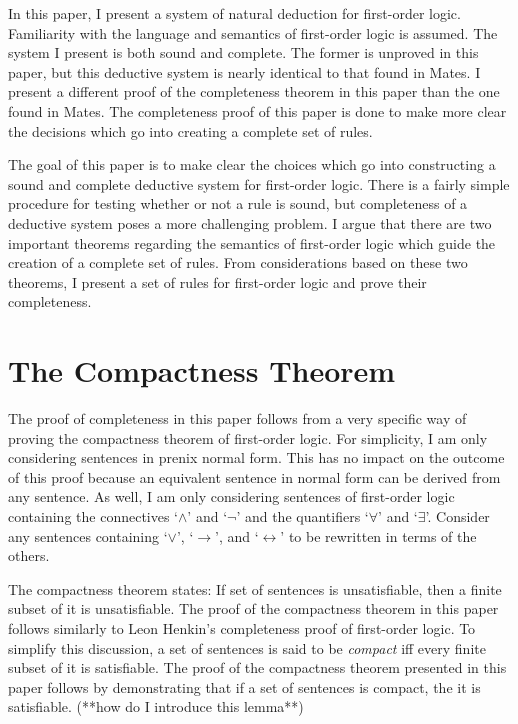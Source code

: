 \documentclass[12pt]{article}
\theoremstyle{definition}
\theoremstyle{remark}
\begin{document}
In this paper, I present a system of natural deduction for first-order logic. Familiarity with the language and semantics of first-order logic is assumed. The system I present is both sound and complete. The former is unproved in this paper, but this deductive system is nearly identical to that found in Mates\cite{mates}. I present a different proof of the completeness theorem in this paper than the one found in Mates. The completeness proof of this paper is done to make more clear the decisions which go into creating a complete set of rules.

The goal of this paper is to make clear the choices which go into constructing a sound and complete deductive system for first-order logic. There is a fairly simple procedure for testing whether or not a rule is sound, but completeness of a deductive system poses a more challenging problem. I argue that there are two important theorems regarding the semantics of first-order logic which guide the creation of a complete set of rules. From considerations based on these two theorems, I present a set of rules for first-order logic and prove their completeness.


\section{The Compactness Theorem}

The proof of completeness in this paper follows from a very specific way of proving the compactness theorem of first-order logic. For simplicity, I am only considering sentences in prenix normal form. This has no impact on the outcome of this proof because an equivalent sentence in normal form can be derived from any sentence. As well, I am only considering sentences of first-order logic containing the connectives `$\land$' and `$\neg$' and the quantifiers `$\forall$' and `$\exists$'. Consider any sentences containing `$\lor$', `$\rightarrow$', and `$\leftrightarrow$' to be rewritten in terms of the others.

The compactness theorem states: If set of sentences is unsatisfiable, then a finite subset of it is unsatisfiable. The proof of the compactness theorem in this paper follows similarly to Leon Henkin's completeness proof of first-order logic\cite{henkin}. To simplify this discussion, a set of sentences is said to be \textit{compact} iff every finite subset of it is satisfiable. The proof of the compactness theorem presented in this paper follows by demonstrating that if a set of sentences is compact, the it is satisfiable. (**how do I introduce this lemma**)
\end{document}
